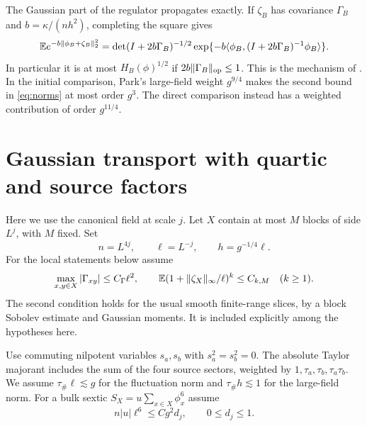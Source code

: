 \documentclass[11pt]{article}
\newcommand{\E}{\mathbb E}
\DeclarePairedDelimiter{\norm}{\lVert}{\rVert}
\begin{document}
The Gaussian part of the regulator propagates exactly. If \(\zeta_B\) has covariance \(\Gamma_B\) and \(b=\kappa/(nh^2)\), completing the square gives
\begin{equation}\label{eq:gaussH}
 \E e^{-b\norm{\phi_B+\zeta_B}_2^2}
 =
 \det(I+2b\Gamma_B)^{-1/2}
 \exp\{-b\langle\phi_B,(I+2b\Gamma_B)^{-1}\phi_B\rangle\}.
\end{equation}
In particular it is at most \(H_B(\phi)^{1/2}\) if \(2b\norm{\Gamma_B}_{\mathrm{op}}\le1\). This is the mechanism of \cite[Appendix C]{ParkMap}. In the initial comparison, Park's large-field weight \(g^{9/4}\) makes the second bound in \eqref{eq:norms} at most order \(g^3\). The direct comparison instead has a weighted contribution of order \(g^{11/4}\).

\section{Gaussian transport with quartic and source factors}

Here we use the canonical field at scale \(j\). Let \(X\) contain at most \(M\) blocks of side \(L^j\), with \(M\) fixed. Set
\[
 n=L^{4j},\qquad \ell=L^{-j},\qquad h=g^{-1/4}\ell.
\]
For the local statements below assume
\begin{equation}\label{eq:covass}
 \max_{x,y\in X}|\Gamma_{xy}|\le C_\Gamma\ell^2,\qquad
 \E(1+\norm{\zeta_X}_\infty/\ell)^k\le C_{k,M}
 \quad(k\ge1).
\end{equation}
The second condition holds for the usual smooth finite-range slices, by a block Sobolev estimate and Gaussian moments. It is included explicitly among the hypotheses here.

Use commuting nilpotent variables \(s_a,s_b\) with \(s_a^2=s_b^2=0\). The absolute Taylor majorant includes the sum of the four source sectors, weighted by \(1,\tau_a,\tau_b,\tau_a\tau_b\). We assume \(\tau_\#\ell\lesssim g\) for the fluctuation norm and \(\tau_\# h\lesssim1\) for the large-field norm. For a bulk sextic \(S_X=u\sum_{x\in X}\phi_x^6\) assume
\begin{equation}\label{eq:sizesix}
 n|u|\ell^6\le Cg^2 d_j,\qquad 0\le d_j\le1.
\end{equation}
\end{document}
